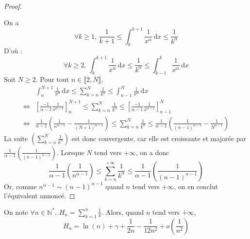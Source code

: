 \begin{proof}
\begin{center}
\begin{tikzpicture}[scale=1.5]
      \end{tikzpicture}
    \end{center}
    On a
    \[ \forall k \geq 1, \, \frac{1}{k+1} \leq \int_k^{k+1} \frac{1}{x^\alpha} \, \mathrm{d}x \leq \frac{1}{k^\alpha} \]
    D'où :
    \[ \forall k \geq 2, \, \int_k^{k+1} \frac{1}{x^\alpha} \, \mathrm{d}x \leq \frac{1}{k^\alpha} \leq \int_{k-1}^k \frac{1}{x^\alpha} \, \mathrm{d}x \]
    Soit $N \geq 2$. Pour tout $n \in \llbracket 2, N \rrbracket$,
    \begin{align*}
      &\int_n^{N+1} \frac{1}{x^\alpha} \, \mathrm{d}x \leq \sum_{k=n}^N \frac{1}{k^\alpha} \leq \int_{n-1}^N \frac{1}{x^\alpha} \, \mathrm{d}x \\
      \iff& \left[ \frac{-1}{\alpha - 1} \frac{1}{x^{\alpha - 1}} \right]^{N+1}_n \leq \sum_{k=n}^N \frac{1}{k^\alpha} \leq \left[ \frac{-1}{\alpha - 1} \frac{1}{x^{\alpha - 1}} \right]^N_{n-1} \\
      \iff& \frac{1}{\alpha - 1} \left( \frac{1}{n^{\alpha - 1}} - \frac{1}{(N+1)^{\alpha - 1}} \right) \leq \sum_{k=n}^N \frac{1}{k^\alpha} \leq \frac{1}{\alpha - 1} \left( \frac{1}{(n-1)^{\alpha - 1}} - \frac{1}{N^{\alpha - 1}} \right)
    \end{align*}
    La suite $\left(\sum_{k=n}^N \frac{1}{k^\alpha} \right)$ est donc convergente, car elle est croissante et majorée par $\frac{1}{\alpha - 1} \left( \frac{1}{(n-1)^{\alpha - 1}} \right)$. Lorsque $N$ tend vers $+\infty$, on a donc
    \[ \frac{1}{\alpha - 1} \left( \frac{1}{n^{\alpha - 1}} \right) \leq \sum_{k=n}^{+\infty} \frac{1}{k^\alpha} \leq \frac{1}{\alpha - 1} \left( \frac{1}{(n-1)^{\alpha - 1}} \right) \]
    Or, comme $n^{\alpha - 1} \sim (n-1)^{\alpha - 1}$ quand $n$ tend vers $+\infty$, on en conclut l'équivalent annoncé.
  \end{proof}

  \begin{theorem}
    On note $\forall n \in \mathbb{N}^*, \, H_n = \sum_{k=1}^{n} \frac{1}{k}$. Alors, quand $n$ tend vers $+\infty$,
    \[ H_n = \ln(n) + \gamma + \frac{1}{2n} - \frac{1}{12n^2} + o\left( \frac{1}{n^2} \right) \]
  \end{theorem}


